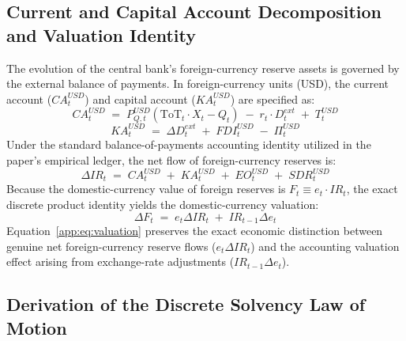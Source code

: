 \subsection{Current and Capital Account Decomposition and Valuation Identity}
\label{app:current_account}

The evolution of the central bank's foreign-currency reserve assets is governed by the external balance of payments. In foreign-currency units (USD), the current account ($CA_t^{USD}$) and capital account ($KA_t^{USD}$) are specified as:
\begin{equation}
	\label{app:eq:CA}
	CA_t^{USD} \;=\; P_{Q,t}^{USD}\!\left(\text{ToT}_t \cdot X_t - Q_t\right) \;-\; r_t \cdot D_t^{ext} \;+\; T_t^{USD}
\end{equation}
\begin{equation}
	\label{app:eq:KA}
	KA_t^{USD} \;=\; \Delta D_t^{ext} \;+\; FDI_t^{USD} \;-\; \Pi_t^{USD}
\end{equation}
Under the standard balance-of-payments accounting identity utilized in the paper's empirical ledger, the net flow of foreign-currency reserves is:
\begin{equation}
	\label{app:eq:bop_flow}
	\Delta IR_t \;=\; CA_t^{USD} \;+\; KA_t^{USD} \;+\; EO_t^{USD} \;+\; SDR_t^{USD}
\end{equation}
Because the domestic-currency value of foreign reserves is $F_t \equiv e_t \cdot IR_t$, the exact discrete product identity yields the domestic-currency valuation:
\begin{equation}
	\label{app:eq:valuation}
	\Delta F_t \;=\; e_t \Delta IR_t \;+\; IR_{t-1} \Delta e_t
\end{equation}
Equation~\eqref{app:eq:valuation} preserves the exact economic distinction between genuine net foreign-currency reserve flows ($e_t \Delta IR_t$) and the accounting valuation effect arising from exchange-rate adjustments ($IR_{t-1} \Delta e_t$).

\subsection{Derivation of the Discrete Solvency Law of Motion}
\label{app:solvr_substitution}

